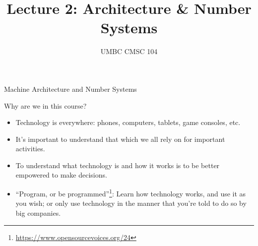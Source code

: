 \documentclass[graphics]{beamer}
\title{Lecture 2: Architecture \& Number Systems}
\author{UMBC CMSC 104}
\date{}
\begin{document}
\begin{frame}{}
\centering
    Machine Architecture and Number Systems
\end{frame}

\frame{\tableofcontents}

\begin{frame}{Why are we in this course?}
        \begin{itemize}
            \item Technology is everywhere: phones, computers, tablets, game consoles, etc.
            \item It's important to understand that which we all rely on for important activities.
            \item To understand what technology is and how it works is to be better empowered to make decisions.
            \item ``Program, or be programmed''\footnote{\url{https://www.opensourcevoices.org/24}}: Learn how technology works, and use it as you wish; or only use technology in the manner that you're told to do so by big companies.
        \end{itemize}
\end{frame}
\end{document}
